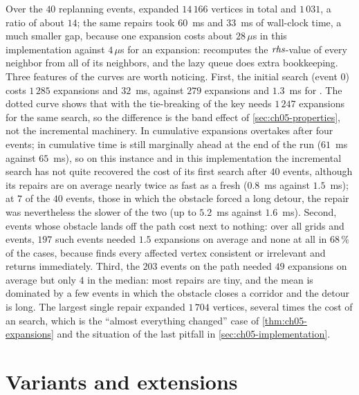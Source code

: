 Over the $40$ replanning events, \astar expanded $14\,166$ vertices in total and
\dstarlite $1\,031$, a ratio of about $14$; the same repairs took $60$~ms and $33$~ms of
wall-clock time, a much smaller gap, because one \dstarlite expansion costs about
$28\,\mu$s in this implementation against $4\,\mu$s for an \astar expansion:
\DslUpdateVertex recomputes the $\mathit{rhs}$-value of every neighbor from all of its
neighbors, and the lazy queue does extra bookkeeping. Three features of the curves are
worth noticing. First, the initial search (event $0$) costs \dstarlite $1\,285$
expansions and $32$~ms, against $279$ expansions and $1.3$~ms for \astar. The dotted
curve shows that \astar with the tie-breaking of the \dstarlite key needs $1\,247$
expansions for the same search, so the difference is the band effect of
\cref{sec:ch05-properties}, not the incremental machinery. In cumulative expansions
\dstarlite overtakes \astar after four events; in cumulative time \astar is still
marginally ahead at the end of the run ($61$~ms against $65$~ms), so on this instance
and in this implementation the incremental search has not quite recovered the cost of
its first search after $40$ events, although its repairs are on average nearly twice as
fast as a fresh \astar ($0.8$~ms against $1.5$~ms); at $7$ of the $40$ events, those in
which the obstacle forced a long detour, the repair was nevertheless the slower of the
two (up to $5.2$~ms against $1.6$~ms). Second, events whose obstacle lands off the
path cost \dstarlite next to nothing: over all grids and events, $197$ such events
needed $1.5$ expansions on average and none at all in $68\,\%$ of the cases, because
\DslUpdateVertex finds every affected vertex consistent or irrelevant and
\DslComputeShortestPath returns immediately. Third, the $203$ events on the path needed
$49$ expansions on average but only $4$ in the median: most repairs are tiny, and the
mean is dominated by a few events in which the obstacle closes a corridor and the detour
is long. The largest single repair expanded $1\,704$ vertices, several times the cost of
an \astar search, which is the ``almost everything changed'' case of
\cref{thm:ch05-expansions} and the situation of the last pitfall in
\cref{sec:ch05-implementation}.

\section{Variants and extensions}
\label{sec:ch05-variants}

